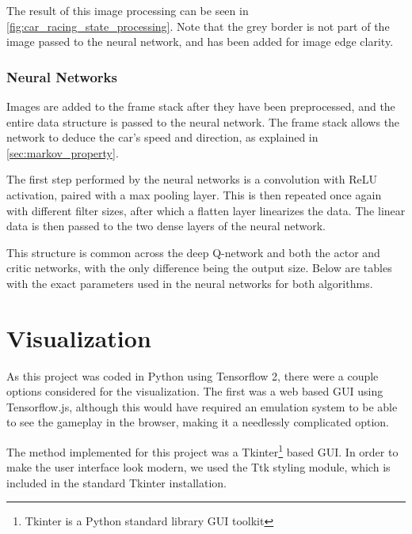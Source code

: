 \newpage



The result of this image processing can be seen in
\autoref{fig:car_racing_state_processing}. Note that the grey border is not
part of the image passed to the neural network, and has been added for image
edge clarity.



\subsubsection{Neural Networks}

Images are added to the frame stack after they have been preprocessed, and the
entire data structure is passed to the neural network. The frame stack allows
the network to deduce the car's speed and direction, as explained in
\autoref{sec:markov_property}.

The first step performed by the neural networks is a convolution with ReLU
activation, paired with a max pooling layer. This is then repeated once again
with different filter sizes, after which a flatten layer linearizes the data.
The linear data is then passed to the two dense layers of the neural network.

This structure is common across the deep Q-network and both the actor and
critic networks, with the only difference being the output size. Below are
tables with the exact parameters used in the neural networks for both
algorithms.





\newpage

\section{Visualization} \label{sec:visualization_design}
As this project was coded in Python using Tensorflow 2, there were a couple
options considered for the visualization. The first was a web based GUI using
Tensorflow.js, although this would have required an emulation system to be able
to see the gameplay in the browser, making it a needlessly complicated option.

The method implemented for this project was a Tkinter\footnote{Tkinter is a
  Python standard library GUI toolkit} based GUI. In order to make the user
interface look modern, we used the Ttk styling module, which is included in the
standard Tkinter installation.

